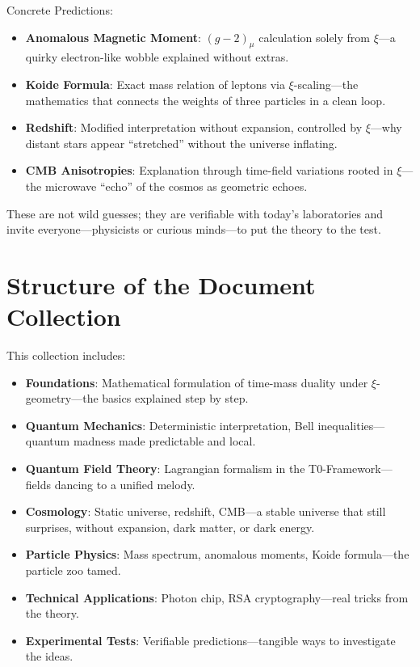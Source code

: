 	\begin{foundation}
		Concrete Predictions:
		\begin{itemize}
			\item \textbf{Anomalous Magnetic Moment}: $(g-2)_\mu$ calculation solely from $\xi$—a quirky electron-like wobble explained without extras.
			\item \textbf{Koide Formula}: Exact mass relation of leptons via $\xi$-scaling—the mathematics that connects the weights of three particles in a clean loop.
			\item \textbf{Redshift}: Modified interpretation without expansion, controlled by $\xi$—why distant stars appear ``stretched'' without the universe inflating.
			\item \textbf{CMB Anisotropies}: Explanation through time-field variations rooted in $\xi$—the microwave ``echo'' of the cosmos as geometric echoes.
		\end{itemize}
	\end{foundation}
	
	These are not wild guesses; they are verifiable with today's laboratories and invite everyone—physicists or curious minds—to put the theory to the test.
	
	\section{Structure of the Document Collection}
	This collection includes:
	\begin{itemize}
		\item \textbf{Foundations}: Mathematical formulation of time-mass duality under $\xi$-geometry—the basics explained step by step.
		\item \textbf{Quantum Mechanics}: Deterministic interpretation, Bell inequalities—quantum madness made predictable and local.
		\item \textbf{Quantum Field Theory}: Lagrangian formalism in the T0-Framework—fields dancing to a unified melody.
		\item \textbf{Cosmology}: Static universe, redshift, CMB—a stable universe that still surprises, without expansion, dark matter, or dark energy.
		\item \textbf{Particle Physics}: Mass spectrum, anomalous moments, Koide formula—the particle zoo tamed.
		\item \textbf{Technical Applications}: Photon chip, RSA cryptography—real tricks from the theory.
		\item \textbf{Experimental Tests}: Verifiable predictions—tangible ways to investigate the ideas.
	\end{itemize}
	
